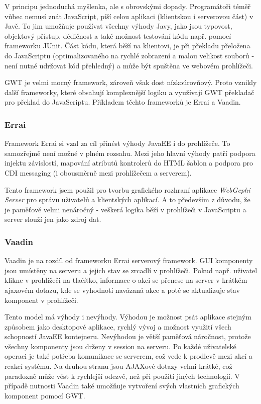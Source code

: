 \documentclass[thesis=M,czech]{FITthesis}[2014/05/6]
\begin{document}
V principu jednoduchá myšlenka, ale s obrovskými dopady. Programátoři téměř vůbec nemusí znát JavaScript, píší celou aplikaci 
(klientskou i serverovou část) v Javě. To jim umožňuje používat všechny výhody Javy, jako jsou typovost, objektový přístup, dědičnost a také 
možnost testování kódu např. pomocí frameworku JUnit. Část kódu, která běží na klientovi, je při překladu přeložena do JavaScriptu
(optimalizovaného na rychlé zobrazení a malou velikost souborů - není nutné udržovat kód přehledný) a může být spuštěna ve webovém prohlížeči.
 
GWT je velmi mocný framework, zároveň však dost nízkoúrovňový. Proto vznikly další frameworky, které obsahují komplexnější logiku a využívají GWT překladač pro 
překlad do JavaScriptu. Příkladem těchto frameworků je Errai a Vaadin.

\subsubsection{Errai}
Framework Errai\cite{errai} si vzal za cíl přinést výhody JavaEE i do prohlížeče. To samozřejmě není možné v plném rozsahu. Mezi jeho hlavní výhody patří
podpora injektu závislostí, mapování atributů kontrolerů do HTML šablon a podpora pro CDI messaging (i obousměrně mezi prohlížečem a serverem).

Tento framework jsem použil pro tvorbu grafického rozhraní aplikace \textit{WebGephi Server} pro správu uživatelů a klientských aplikací.
A to především z důvodu, že je paměťově velmi nenáročný - veškerá logika běží v prohlížeči v JavaScriptu a server slouží jen jako zdroj dat.

\subsubsection{Vaadin}\label{sec:vaadin}
Vaadin\cite{vaadin} je na rozdíl od frameworku Errai serverový framework. GUI komponenty jsou umístěny na serveru a jejich stav se zrcadlí 
v prohlížeči. Pokud např. uživatel klikne v prohlížeči na tlačítko, informace o akci se přenese na server v krátkém ajaxovém dotazu, kde se vyhodnotí navázaná akce
a poté se aktualizuje stav komponent v prohlížeči.

Tento model má výhody i nevýhody. Výhodou je možnost psát aplikace stejným způsobem jako desktopové aplikace, rychlý vývoj a možnost využití všech schopností JavaEE kontejneru.
Nevýhodou je větší paměťová náročnost, protože všechny komponenty jsou drženy v session na serveru. Po každé uživatelské operaci je také potřeba komunikace se serverem, což vede k prodlevě mezi akcí 
a reakcí systému. Na druhou stranu jsou AJAXové dotazy velmi krátké, což paradoxně může vést k rychlejší odezvě, než při použití jiných technologií. V případě nutnosti Vaadin také umožňuje
vytvoření svých vlastních grafických komponent pomocí GWT.
\end{document}
